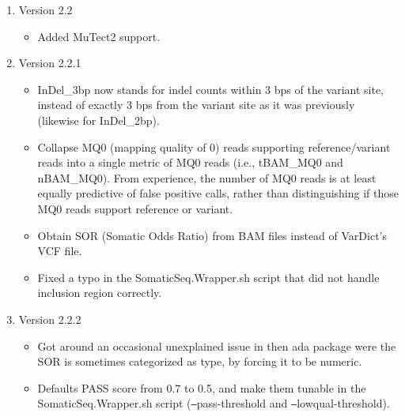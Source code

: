 \documentclass[10pt,letterpaper]{article}
\begin{document}
\begin{sloppypar}
\begin{enumerate}
\begin{itemize}
	\end{itemize}
	
	
	
	\item Version 2.2
	
		\begin{itemize}
		
		  \item
		  Added MuTect2 support.
		
		\end{itemize}
	
	
	
	\item Version 2.2.1
	
		\begin{itemize}
		
		  \item
		  InDel\_3bp now stands for indel counts within 3 bps of the variant site, instead of exactly 3 bps from the variant site as it was previously (likewise for InDel\_2bp). 
		 
		  \item
		  Collapse MQ0 (mapping quality of 0) reads supporting reference/variant reads into a single metric of MQ0 reads (i.e., tBAM\_MQ0 and nBAM\_MQ0). From experience, the number of MQ0 reads is at least equally predictive of false positive calls, rather than distinguishing if those MQ0 reads support reference or variant. 
		  
		  \item
		  Obtain SOR (Somatic Odds Ratio) from BAM files instead of VarDict's VCF file.
		  
		  \item
		  Fixed a typo in the SomaticSeq.Wrapper.sh script that did not handle inclusion region correctly.
		  
		\end{itemize}
	
	
	
	\item Version 2.2.2
	
		\begin{itemize}
		
		  \item
		  Got around an occasional unexplained issue in then ada package were the SOR is sometimes categorized as type, by forcing it to be numeric. 
		  
		  \item
		  Defaults PASS score from 0.7 to 0.5, and make them tunable in the SomaticSeq.Wrapper.sh script (\texttt{--}pass-threshold and \texttt{--}lowqual-threshold). 
		  

\end{itemize}
\end{enumerate}
\end{sloppypar}
\end{document}
